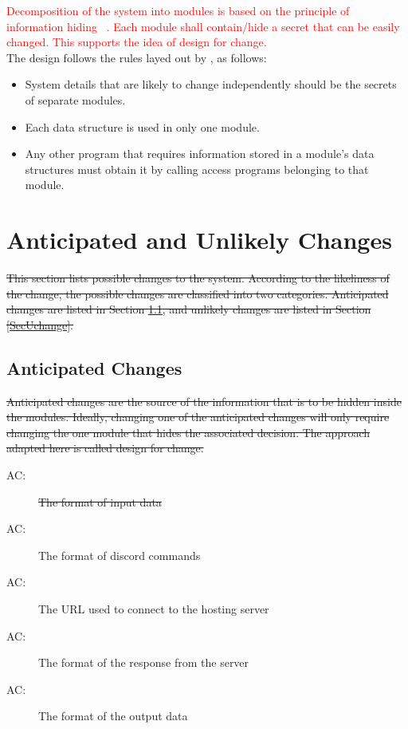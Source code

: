 \documentclass[12pt, titlepage]{article}
\newcounter{acnum}
\newcommand{\actheacnum}{AC\theacnum}
\begin{document}
\textcolor{red}{Decomposition of the system into modules is based on the principle of information hiding \mbox{~\citep{Parnas1972a}}. Each module shall contain/hide a secret that can be easily changed. This supports the idea of design for change.}\\

The design follows the rules layed out by \citet{ParnasEtAl1984}, as follows:
\begin{itemize}
\item System details that are likely to change independently should be the
  secrets of separate modules.
\item Each data structure is used in only one module.
\item Any other program that requires information stored in a module's data
  structures must obtain it by calling access programs belonging to that module.
\end{itemize}

\section{Anticipated and Unlikely Changes} \label{SecChange}

\sout{This section lists possible changes to the system. According to the likeliness of the change, the possible changes are classified into two categories. Anticipated changes are listed in Section \ref{SecAchange}, and unlikely changes are listed in Section \ref{SecUchange}.}

\subsection{Anticipated Changes} \label{SecAchange}
\sout{Anticipated changes are the source of the information that is to be hidden inside the modules. Ideally, changing one of the anticipated changes will only require changing the one module that hides the associated decision. The approach adapted here is called design for change.}

\begin{description}
\item[ \actheacnum \label{acInput1}:] \sout{The format of input data}
\item[ \actheacnum \label{acInput2}:] The format of discord commands
\item[ \actheacnum \label{acServer1}:] The URL used to connect to the hosting server
\item[ \actheacnum \label{acServer2}:] The format of the response from the server
\item[ \actheacnum \label{acOutput}:] The format of the output data
\end{description}
\end{document}
